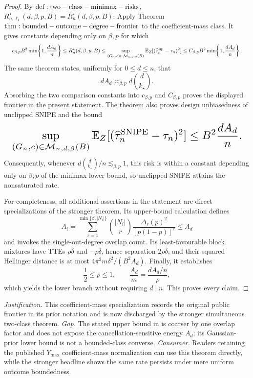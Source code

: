 \documentclass{article}
\begin{document}
\begin{proof}
By \({\rm def:two-class-minimax-risks}\), \(R_{n,\ell_1}^{\star}(d,\beta,p,B)=R_n^\star(d,\beta,p,B)\). Apply Theorem \({\rm thm:bounded-outcome-degree-frontier}\) to the coefficient-mass class. It gives constants depending only on \(\beta,p\) for which
\[
\makebox[\linewidth][c]{\resizebox{0.98\linewidth}{!}{\(\displaystyle c_{\beta,p}B^2\min\!\left\{1,\frac{dA_d}{n}\right\}
\le R_n^\star(d,\beta,p,B)
\le \sup_{(G_n,c)\in\mathcal M_{n,d,\beta}(B)}
\mathbb E_Z[(\widehat\tau_n^{\mathrm{up}}-\tau_n)^2]
\le C_{\beta,p}B^2\min\!\left\{1,\frac{dA_d}{n}\right\}.\)}}
\]
The same theorem states, uniformly for \(0\le d\le n\), that
\[
dA_d\asymp_{\beta,p}d\binom d{k_\star}.
\]
Absorbing the two comparison constants into \(c_{\beta,p}\) and \(C_{\beta,p}\) proves the displayed frontier in the present statement. The theorem also proves design unbiasedness of unclipped SNIPE and the bound
\[
\makebox[\linewidth][c]{\resizebox{0.98\linewidth}{!}{\(\displaystyle \sup_{(G_n,c)\in\mathcal M_{n,d,\beta}(B)}
\mathbb E_Z[(\widehat\tau_n^{\mathrm{SNIPE}}-\tau_n)^2]
\le B^2\frac{dA_d}{n}.\)}}
\]
Consequently, whenever \(d\binom d{k_\star}/n\lesssim_{\beta,p}1\), this risk is within a constant depending only on \(\beta,p\) of the minimax lower bound, so unclipped SNIPE attains the nonsaturated rate.

For completeness, all additional assertions in the statement are direct specializations of the stronger theorem. Its upper-bound calculation defines
\[
A_i=\sum_{r=1}^{\min\{\beta,|N_i|\}}\binom{|N_i|}{r}
\frac{\Delta_r(p)^2}{[p(1-p)]^r}\le A_d
\]
and invokes the single-out-degree overlap count. Its least-favourable block mixtures have TTEs \(\rho\delta\) and \(-\rho\delta\), hence separation \(2\rho\delta\), and their squared Hellinger distance is at most \(4\pi^2m\delta^2/(B^2A_d)\). Finally, it establishes
\[
\frac12\le\rho\le1,
\qquad
\frac{A_d}{m}=\frac{dA_d/n}{\rho},
\]
which yields the lower branch without requiring \(d\mid n\). This proves every claim.
\end{proof}
\par\smallskip\noindent \textit{Justification.} This coefficient-mass specialization records the original public frontier in its prior notation and is now discharged by the stronger simultaneous two-class theorem. \textit{Gap.} The stated upper bound in \cite{CortezRodriguezEichhornYu2023} is coarser by one overlap factor and does not expose the cancellation-sensitive energy \(A_d\); its Gaussian-prior lower bound is not a bounded-class converse. \textit{Consumer.} Readers retaining the published \(Y_{\max}\) coefficient-mass normalization can use this theorem directly, while the stronger headline shows the same rate persists under mere uniform outcome boundedness.
\end{document}
